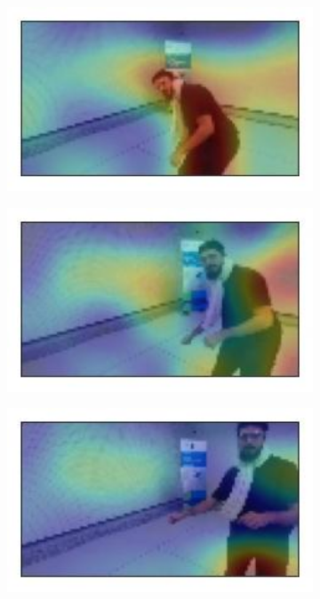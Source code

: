 \begin{figure}[!h]
\begin{center}
\begin{subfigure}[h]{0.24\textwidth}
		\end{subfigure}
		\hfill
		\begin{subfigure}[h]{0.24\textwidth}
			\centering
			\includegraphics[width=1\textwidth]{"contents/images/gradcam/gradcam-beard-04"}
		\end{subfigure}
		\vfill
		\begin{subfigure}[h]{0.24\textwidth}
			\centering
			\includegraphics[width=1\textwidth]{"contents/images/gradcam/gradcam-beard-05"}
		\end{subfigure}
		\hfill
		\begin{subfigure}[h]{0.24\textwidth}
			\centering
			\includegraphics[width=1\textwidth]{"contents/images/gradcam/gradcam-beard-06"}

\end{subfigure}
\end{center}
\end{figure}

